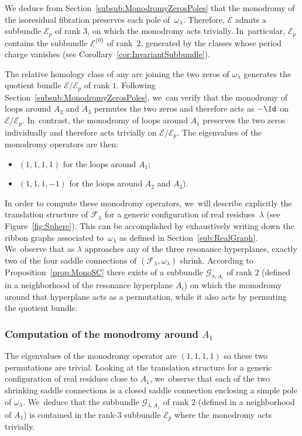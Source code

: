 We deduce from Section~\ref{subsub:MonodromyZerosPoles} that the monodromy of the isoresidual fibration preserves each pole of~$\omega_{\lambda}$. Therefore, $\mathcal{E}$ admits a subbundle $\mathcal{E}_{p}$ of rank $3$, on which the monodromy acts trivially. In~particular, $\mathcal{E}_{p}$ contains the subbundle $\mathcal{E}^{\lbrace{ 0 \rbrace}}$ of rank~$2$, generated by the classes whose period charge vanishes (see Corollary~\ref{cor:InvariantSubbundle}).

The relative homology class of any arc joining the two zeros of $\omega_{\lambda}$ generates the quotient bundle $\mathcal{E}/\mathcal{E}_{p}$ of rank $1$. Following Section~\ref{subsub:MonodromyZerosPoles}, we~can verify that the monodromy of loops around $A_{2}$ and $A_{3}$ permutes the two zeros and therefore acts as $-\Id$ on $\mathcal{E}/\mathcal{E}_{p}$. In~contrast, the monodromy of loops around $A_{1}$ preserves the two zeros individually and therefore acts trivially on $\mathcal{E}/\mathcal{E}_{p}$. The eigenvalues of the monodromy operators are then:
\begin{itemize}
\item $(1,1,1,1)$ for the loops around $A_{1}$;
\item $(1,1,1,-1)$ for the loops around $A_{2}$ and $A_{3}$).
\end{itemize}
In order to compute these monodromy operators, we~will describe explicitly the translation structure of $\mathcal{F}_{\lambda}$ for a generic configuration of real residues~$\lambda$ (see Figure~\ref{fig:Sphere}). This can be accomplished by exhaustively writing down the ribbon graphs associated to~$\omega_\lambda$ as defined in Section~\ref{sub:RealGraph}. We~observe that as $\lambda$ approaches any of the three resonance hyperplanes, exactly two of the four saddle connections of $(\mathcal{F}_{\lambda},\omega_{\lambda})$ shrink. According to Proposition~\ref{prop:MonoSC} there exists of a subbundle $\mathcal{G}_{\lambda,A_{i}}$ of rank $2$ (defined in a neighborhood of the resonance hyperplane $A_{i}$) on which the monodromy around that hyperplane acts as a permutation, while it also acts by permuting the quotient bundle.

\subsubsection{Computation of the monodromy around $A_{1}$}

The eigenvalues of the monodromy operator are $(1,1,1,1)$ so these two permutations are trivial. Looking at the translation structure for a generic configuration of real residues close to $A_{1}$, we~observe that each of the two shrinking saddle connections is a closed saddle connection enclosing a simple pole of $\omega_{\lambda}$. We~deduce that the subbundle $\mathcal{G}_{\lambda,A_{1}}$ of rank $2$ (defined in a neighborhood of $A_{1}$) is contained in the rank-$3$ subbundle $\mathcal{E}_{p}$ where the monodromy acts trivially.

